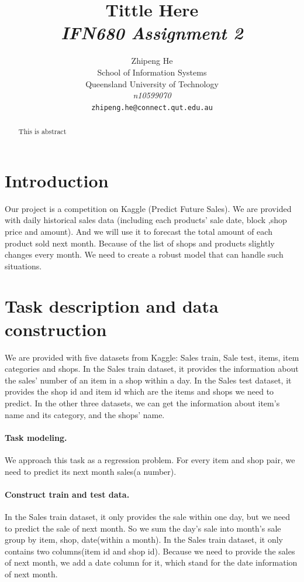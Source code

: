\documentclass{article}
\title{Tittle Here \\
{\sl \Large IFN680 Assignment 2}}
\author{
 Zhipeng He \\
  School of Information Systems\\
  Queensland University of Technology\\
  \textit{n10599070} \\
  \texttt{zhipeng.he@connect.qut.edu.au} \\
}
\begin{document}
\maketitle

\begin{abstract}
This is abstract
\end{abstract}

\section{Introduction}

Our project is a competition on Kaggle (Predict Future Sales). We are provided with daily historical sales data (including each products’ sale date, block ,shop price and amount). And we will use it to forecast the total amount of each product sold next month. Because of the list of shops and products slightly changes every month. We need to create a robust model that can handle such situations.


\section{Task description and data construction}
\label{sec:headings}
We are provided with five datasets from Kaggle: Sales train, Sale test, items, item categories and shops. In the Sales train dataset, it provides the information about the sales’ number of an item in a shop within a day. In the Sales test dataset, it provides the shop id and item id which are the items and shops we need to predict. In the other three datasets, we can get the information about item’s name and its category, and the shops’ name.
\paragraph{Task modeling.}
We approach this task as a regression problem. For every item and shop pair, we need to predict its next month sales(a number).
\paragraph{Construct train and test data.}
In the Sales train dataset, it only provides the sale within one day, but we need to predict the sale of next month. So we sum the day's sale into month's sale group by item, shop, date(within a month).
In the Sales train dataset, it only contains two columns(item id and shop id). Because we need to provide the sales of next month, we add a date column for it, which stand for the date information of next month.
\end{document}
